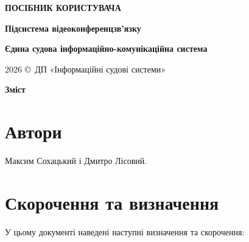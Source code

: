 \documentclass{article}
\newcommand\HUGE[1]{\fontsize{40}{40}\selectfont #1}
\begin{document}
\pagestyle{fancy}

\begin{titlepage}
  \AddToShipoutPictureBG*{\AtPageLowerLeft{\color{nato}\rule{\paperwidth}{\paperheight}}}
  \color{white}\thispagestyle{empty}\vspace*{4cm}\centering
  {\Huge  \textbf{ПОСІБНИК КОРИСТУВАЧА} \par} \vspace{2cm}
  {\HUGE  \textbf{Підсистема відеоконференцзв’язку} \par} \vspace{2.5cm}
  {\LARGE \textbf{Єдина судова інформаційно-комунікаційна система} \par} \vspace{2.5cm}
  \vfill
  {\large 2026 \copyright\ ДП «Інформаційні судові системи» \par}
\end{titlepage}

\newpage

\begin{center}
  {\Huge\color{nato}\bfseries Зміст\par}
\end{center}
\vspace{40pt}
\tableofcontents

\newpage

\section{Автори}

Максим Сохацький і Дмитро Лісовий.

\section{Скорочення та визначення}

У цьому документі наведені наступні визначення та скорочення:
\end{document}
